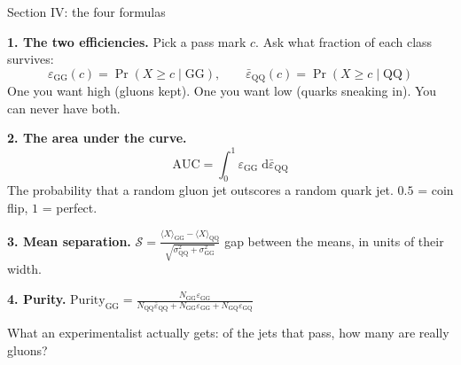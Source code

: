\documentclass[aspectratio=169,10pt]{beamer}
\begin{document}
\begin{frame}{Section IV: the four formulas}

\textbf{1. The two efficiencies.} Pick a pass mark $c$. Ask what fraction of
each class survives:
\[
\varepsilon_{\mathrm{GG}}(c) = \Pr(X \ge c \mid \mathrm{GG}),
\qquad
\bar{\varepsilon}_{\mathrm{QQ}}(c) = \Pr(X \ge c \mid \mathrm{QQ})
\]
\footnotesize One you want high (gluons kept). One you want low (quarks
sneaking in). You can never have both.

\vspace{0.8em}
\normalsize
\textbf{2. The area under the curve.}
\[
\mathrm{AUC} = \int_0^1 \varepsilon_{\mathrm{GG}}\;
\mathrm{d}\bar{\varepsilon}_{\mathrm{QQ}}
\]
\footnotesize The probability that a random gluon jet outscores a random quark
jet. $0.5$ = coin flip, $1$ = perfect.

\vspace{0.8em}
\normalsize
\textbf{3. Mean separation.}
\quad
$\displaystyle
\mathcal{S} = \frac{\langle X\rangle_{\mathrm{GG}} - \langle X\rangle_{\mathrm{QQ}}}
{\sqrt{\sigma^2_{\mathrm{QQ}} + \sigma^2_{\mathrm{GG}}}}$
\quad
\footnotesize gap between the means, in units of their width.

\vspace{0.8em}
\normalsize
\textbf{4. Purity.}
\quad
$\displaystyle
\mathrm{Purity}_{\mathrm{GG}} =
\frac{N_{\mathrm{GG}}\varepsilon_{\mathrm{GG}}}
{N_{\mathrm{QQ}}\bar{\varepsilon}_{\mathrm{QQ}} + N_{\mathrm{GG}}\varepsilon_{\mathrm{GG}}
+ N_{\mathrm{GQ}}\varepsilon_{\mathrm{GQ}}}$

\footnotesize
\vspace{0.3em}
What an experimentalist actually gets: of the jets that pass, how many are
really gluons?

\end{frame}
\end{document}
